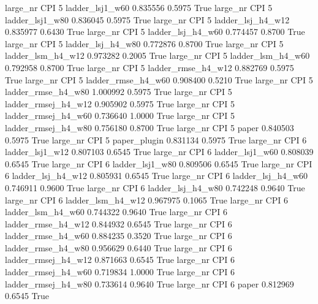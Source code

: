   large_nr      CPI                 5     ladder_lsj1_w60   0.835556      0.5975    True
  large_nr      CPI                 5     ladder_lsj1_w80   0.836045      0.5975    True
  large_nr      CPI                 5   ladder_lsj_h4_w12   0.835977      0.6430    True
  large_nr      CPI                 5   ladder_lsj_h4_w60   0.774457      0.8700    True
  large_nr      CPI                 5   ladder_lsj_h4_w80   0.772876      0.8700    True
  large_nr      CPI                 5   ladder_lsm_h4_w12   0.973282      0.2005    True
  large_nr      CPI                 5   ladder_lsm_h4_w60   0.792958      0.8700    True
  large_nr      CPI                 5  ladder_rmse_h4_w12   0.882769      0.5975    True
  large_nr      CPI                 5  ladder_rmse_h4_w60   0.908400      0.5210    True
  large_nr      CPI                 5  ladder_rmse_h4_w80   1.000992      0.5975    True
  large_nr      CPI                 5 ladder_rmsej_h4_w12   0.905902      0.5975    True
  large_nr      CPI                 5 ladder_rmsej_h4_w60   0.736640      1.0000    True
  large_nr      CPI                 5 ladder_rmsej_h4_w80   0.756180      0.8700    True
  large_nr      CPI                 5               paper   0.840503      0.5975    True
  large_nr      CPI                 5        paper_plugin   0.831134      0.5975    True
  large_nr      CPI                 6     ladder_lsj1_w12   0.807103      0.6545    True
  large_nr      CPI                 6     ladder_lsj1_w60   0.808039      0.6545    True
  large_nr      CPI                 6     ladder_lsj1_w80   0.809506      0.6545    True
  large_nr      CPI                 6   ladder_lsj_h4_w12   0.805931      0.6545    True
  large_nr      CPI                 6   ladder_lsj_h4_w60   0.746911      0.9600    True
  large_nr      CPI                 6   ladder_lsj_h4_w80   0.742248      0.9640    True
  large_nr      CPI                 6   ladder_lsm_h4_w12   0.967975      0.1065    True
  large_nr      CPI                 6   ladder_lsm_h4_w60   0.744322      0.9640    True
  large_nr      CPI                 6  ladder_rmse_h4_w12   0.844932      0.6545    True
  large_nr      CPI                 6  ladder_rmse_h4_w60   0.884235      0.3520    True
  large_nr      CPI                 6  ladder_rmse_h4_w80   0.956629      0.6440    True
  large_nr      CPI                 6 ladder_rmsej_h4_w12   0.871663      0.6545    True
  large_nr      CPI                 6 ladder_rmsej_h4_w60   0.719834      1.0000    True
  large_nr      CPI                 6 ladder_rmsej_h4_w80   0.733614      0.9640    True
  large_nr      CPI                 6               paper   0.812969      0.6545    True

